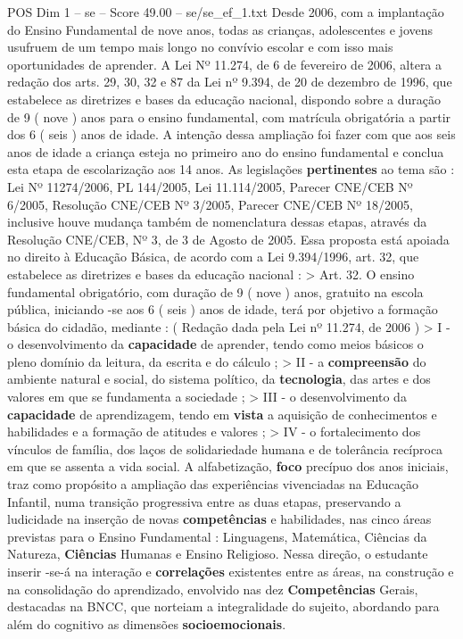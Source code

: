 \begin{textsample}{POS Dim 1 – se – Score 49.00 – se/se\_ef\_1.txt}
Desde 2006, com a implantação do Ensino Fundamental de nove anos, todas as crianças, adolescentes e jovens usufruem de um tempo mais longo no convívio escolar e com isso mais oportunidades de aprender.
A Lei Nº 11.274, de 6 de fevereiro de 2006, altera a redação dos arts. 29, 30, 32 e 87 da Lei nº 9.394, de 20 de dezembro de 1996, que estabelece as diretrizes e bases da educação nacional, dispondo sobre a duração de 9 ( nove ) anos para o ensino fundamental, com matrícula obrigatória a partir dos 6 ( seis ) anos de idade.
A intenção dessa ampliação foi fazer com que aos seis anos de idade a criança esteja no primeiro ano do ensino fundamental e conclua esta etapa de escolarização aos 14 anos.
As legislações \textbf{pertinentes} ao tema são : Lei Nº 11274/2006, PL 144/2005, Lei 11.114/2005, Parecer CNE/CEB Nº 6/2005, Resolução CNE/CEB Nº 3/2005, Parecer CNE/CEB Nº 18/2005, inclusive houve mudança também de nomenclatura dessas etapas, através da Resolução CNE/CEB, Nº 3, de 3 de Agosto de 2005.
Essa proposta está apoiada no direito à Educação Básica, de acordo com a Lei 9.394/1996, art. 32, que estabelece as diretrizes e bases da educação nacional : > Art. 32.
O ensino fundamental obrigatório, com duração de 9 ( nove ) anos, gratuito na escola pública, iniciando -se aos 6 ( seis ) anos de idade, terá por objetivo a formação básica do cidadão, mediante : ( Redação dada pela Lei nº 11.274, de 2006 ) > I - o desenvolvimento da \textbf{capacidade} de aprender, tendo como meios básicos o pleno domínio da leitura, da escrita e do cálculo ; > II - a \textbf{compreensão} do ambiente natural e social, do sistema político, da \textbf{tecnologia}, das artes e dos valores em que se fundamenta a sociedade ; > III - o desenvolvimento da \textbf{capacidade} de aprendizagem, tendo em \textbf{vista} a aquisição de conhecimentos e habilidades e a formação de atitudes e valores ; > IV - o fortalecimento dos vínculos de família, dos laços de solidariedade humana e de tolerância recíproca em que se assenta a vida social.
A alfabetização, \textbf{foco} precípuo dos anos iniciais, traz como propósito a ampliação das experiências vivenciadas na Educação Infantil, numa transição progressiva entre as duas etapas, preservando a ludicidade na inserção de novas \textbf{competências} e habilidades, nas cinco áreas previstas para o Ensino Fundamental : Linguagens, Matemática, Ciências da Natureza, \textbf{Ciências} Humanas e Ensino Religioso.
Nessa direção, o estudante inserir -se-á na interação e \textbf{correlações} existentes entre as áreas, na construção e na consolidação do aprendizado, envolvido nas dez \textbf{Competências} Gerais, destacadas na BNCC, que norteiam a integralidade do sujeito, abordando para além do cognitivo as dimensões \textbf{socioemocionais}.

\end{textsample}
